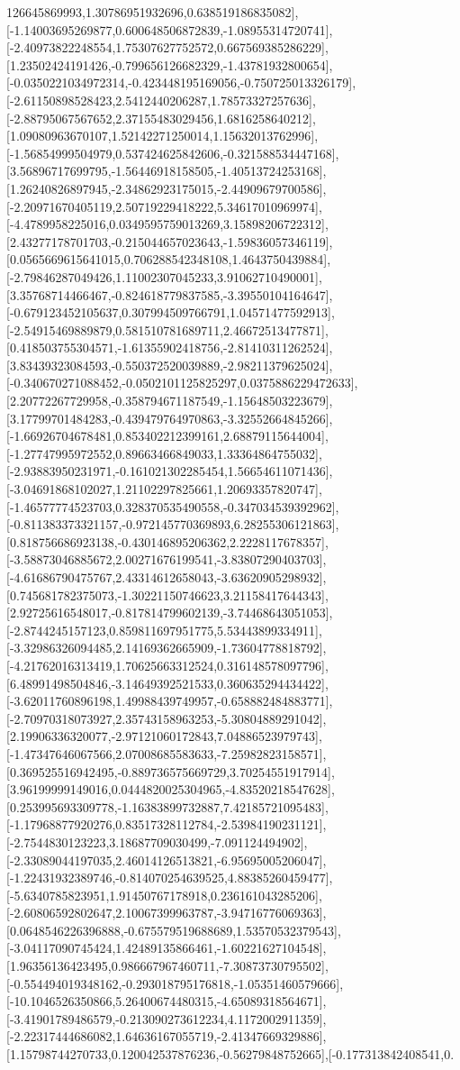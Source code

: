 \documentclass{article}
\begin{document}
126645869993,1.30786951932696,0.638519186835082],[-1.14003695269877,0.600648506872839,-1.08955314720741],[-2.40973822248554,1.75307627752572,0.667569385286229],[1.23502424191426,-0.799656126682329,-1.43781932800654],[-0.0350221034972314,-0.423448195169056,-0.750725013326179],[-2.61150898528423,2.5412440206287,1.78573327257636],[-2.88795067567652,2.37155483029456,1.6816258640212],[1.09080963670107,1.52142271250014,1.15632013762996],[-1.56854999504979,0.537424625842606,-0.321588534447168],[3.56896717699795,-1.56446918158505,-1.40513724253168],[1.26240826897945,-2.34862923175015,-2.44909679700586],[-2.20971670405119,2.50719229418222,5.34617010969974],[-4.4789958225016,0.0349595759013269,3.15898206722312],[2.43277178701703,-0.215044657023643,-1.59836057346119],[0.0565669615641015,0.706288542348108,1.4643750439884],[-2.79846287049426,1.11002307045233,3.91062710490001],[3.35768714466467,-0.824618779837585,-3.39550104164647],[-0.679123452105637,0.307994509766791,1.04571477592913],[-2.54915469889879,0.581510781689711,2.46672513477871],[0.418503755304571,-1.61355902418756,-2.81410311262524],[3.83439323084593,-0.550372520039889,-2.98211379625024],[-0.340670271088452,-0.0502101125825297,0.0375886229472633],[2.20772267729958,-0.358794671187549,-1.15648503223679],[3.17799701484283,-0.439479764970863,-3.32552664845266],[-1.66926704678481,0.853402212399161,2.68879115644004],[-1.27747995972552,0.89663466849033,1.33364864755032],[-2.93883950231971,-0.161021302285454,1.56654611071436],[-3.04691868102027,1.21102297825661,1.20693357820747],[-1.46577774523703,0.328370535490558,-0.347034539392962],[-0.811383373321157,-0.972145770369893,6.28255306121863],[0.818756686923138,-0.430146895206362,2.2228117678357],[-3.58873046885672,2.00271676199541,-3.83807290403703],[-4.61686790475767,2.43314612658043,-3.63620905298932],[0.745681782375073,-1.30221150746623,3.21158417644343],[2.92725616548017,-0.817814799602139,-3.74468643051053],[-2.8744245157123,0.859811697951775,5.53443899334911],[-3.32986326094485,2.14169362665909,-1.73604778818792],[-4.21762016313419,1.70625663312524,0.316148578097796],[6.48991498504846,-3.14649392521533,0.360635294434422],[-3.62011760896198,1.49988439749957,-0.658882484883771],[-2.70970318073927,2.35743158963253,-5.30804889291042],[2.19906336320077,-2.97121060172843,7.04886523979743],[-1.47347646067566,2.07008685583633,-7.25982823158571],[0.369525516942495,-0.889736575669729,3.70254551917914],[3.96199999149016,0.0444820025304965,-4.83520218547628],[0.253995693309778,-1.16383899732887,7.42185721095483],[-1.17968877920276,0.83517328112784,-2.53984190231121],[-2.7544830123223,3.18687709030499,-7.091124494902],[-2.33089044197035,2.46014126513821,-6.95695005206047],[-1.22431932389746,-0.814070254639525,4.88385260459477],[-5.6340785823951,1.91450767178918,0.236161043285206],[-2.60806592802647,2.10067399963787,-3.94716776069363],[0.0648546226396888,-0.675579519688689,1.53570532379543],[-3.04117090745424,1.42489135866461,-1.60221627104548],[1.96356136423495,0.986667967460711,-7.30873730795502],[-0.554494019348162,-0.293018795176818,-1.05351460579666],[-10.1046526350866,5.26400674480315,-4.65089318564671],[-3.41901789486579,-0.213090273612234,4.1172002911359],[-2.22317444686082,1.64636167055719,-2.41347669329886],[1.15798744270733,0.120042537876236,-0.56279848752665],[-0.177313842408541,0.
\end{document}
